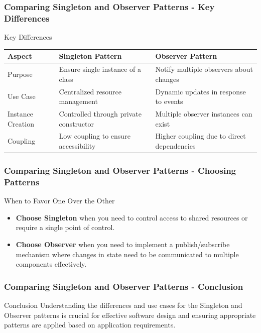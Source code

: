\documentclass{beamer}
\begin{document}
\begin{frame}
    \frametitle{Comparing Singleton and Observer Patterns - Key Differences}
    \begin{block}{Key Differences}
        \begin{center}
        \begin{tabular}{|l|l|l|}
            \hline
            \textbf{Aspect} & \textbf{Singleton Pattern} & \textbf{Observer Pattern} \\
            \hline
            Purpose & Ensure single instance of a class & Notify multiple observers about changes \\
            \hline
            Use Case & Centralized resource management & Dynamic updates in response to events \\
            \hline
            Instance Creation & Controlled through private constructor & Multiple observer instances can exist \\
            \hline
            Coupling & Low coupling to ensure accessibility & Higher coupling due to direct dependencies \\
            \hline
        \end{tabular}
        \end{center}
    \end{block}
\end{frame}

\begin{frame}
    \frametitle{Comparing Singleton and Observer Patterns - Choosing Patterns}
    \begin{block}{When to Favor One Over the Other}
        \begin{itemize}
            \item \textbf{Choose Singleton} when you need to control access to shared resources or require a single point of control.
            \item \textbf{Choose Observer} when you need to implement a publish/subscribe mechanism where changes in state need to be communicated 
            to multiple components effectively.
        \end{itemize}
    \end{block}
\end{frame}

\begin{frame}
    \frametitle{Comparing Singleton and Observer Patterns - Conclusion}
    \begin{block}{Conclusion}
        Understanding the differences and use cases for the Singleton and Observer patterns is crucial for effective software design 
        and ensuring appropriate patterns are applied based on application requirements.
    \end{block}
\end{frame}
\end{document}
